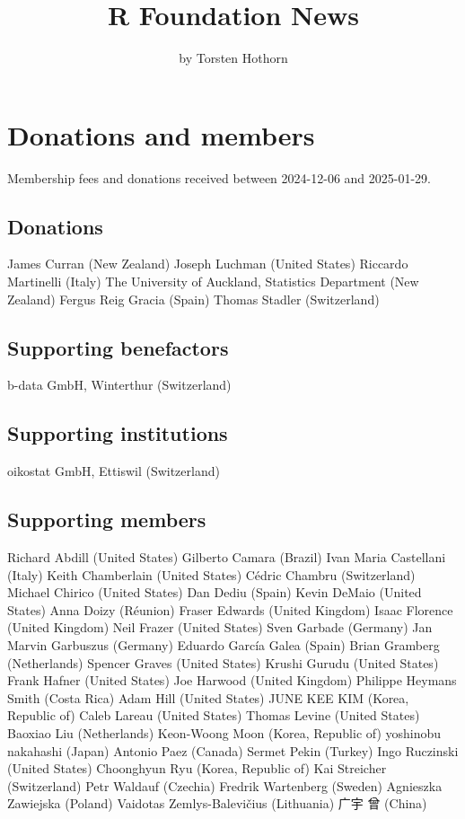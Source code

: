 \title{R Foundation News}


\author{by Torsten Hothorn}

\maketitle


\section{Donations and members}\label{donations-and-members}

Membership fees and donations received between
2024-12-06 and 2025-01-29.

\subsection{Donations}\label{donations}

James Curran (New Zealand)
Joseph Luchman (United States)
Riccardo Martinelli (Italy)
The University of Auckland, Statistics Department (New Zealand)
Fergus Reig Gracia (Spain)
Thomas Stadler (Switzerland)

\subsection{Supporting benefactors}\label{supporting-benefactors}

b-data GmbH, Winterthur (Switzerland)

\subsection{Supporting institutions}\label{supporting-institutions}

oikostat GmbH, Ettiswil (Switzerland)

\subsection{Supporting members}\label{supporting-members}

Richard Abdill (United States)
Gilberto Camara (Brazil)
Ivan Maria Castellani (Italy)
Keith Chamberlain (United States)
Cédric Chambru (Switzerland)
Michael Chirico (United States)
Dan Dediu (Spain)
Kevin DeMaio (United States)
Anna Doizy (Réunion)
Fraser Edwards (United Kingdom)
Isaac Florence (United Kingdom)
Neil Frazer (United States)
Sven Garbade (Germany)
Jan Marvin Garbuszus (Germany)
Eduardo García Galea (Spain)
Brian Gramberg (Netherlands)
Spencer Graves (United States)
Krushi Gurudu (United States)
Frank Hafner (United States)
Joe Harwood (United Kingdom)
Philippe Heymans Smith (Costa Rica)
Adam Hill (United States)
JUNE KEE KIM (Korea, Republic of)
Caleb Lareau (United States)
Thomas Levine (United States)
Baoxiao Liu (Netherlands)
Keon-Woong Moon (Korea, Republic of)
yoshinobu nakahashi (Japan)
Antonio Paez (Canada)
Sermet Pekin (Turkey)
Ingo Ruczinski (United States)
Choonghyun Ryu (Korea, Republic of)
Kai Streicher (Switzerland)
Petr Waldauf (Czechia)
Fredrik Wartenberg (Sweden)
Agnieszka Zawiejska (Poland)
Vaidotas Zemlys-Balevičius (Lithuania)
广宇 曾 (China)


